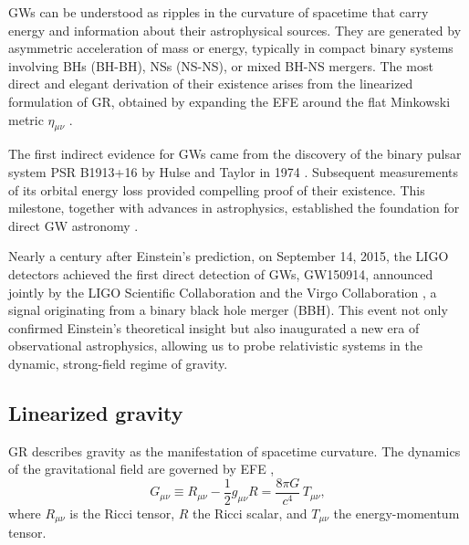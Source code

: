 GWs can be understood as ripples in the curvature of spacetime that carry energy and information about their astrophysical sources. They are generated by asymmetric acceleration of mass or energy, typically in compact binary systems involving BHs (BH-BH), NSs (NS-NS), or mixed BH-NS mergers. The most direct and elegant derivation of their existence arises from the linearized formulation of GR, obtained by expanding the EFE around the flat Minkowski metric $\eta_{\mu\nu}$ \cite{maggiore2007gravitational}.

The first indirect evidence for GWs came from the discovery of the binary pulsar system PSR B1913+16 by Hulse and Taylor in 1974 \cite{Binarypulsar}. Subsequent measurements of its orbital energy loss provided compelling proof of their existence. This milestone, together with advances in astrophysics, established the foundation for direct GW astronomy \cite{GW150914}.

Nearly a century after Einstein’s prediction, on September 14, 2015, the LIGO detectors achieved the first direct detection of GWs, GW150914, announced jointly by the LIGO Scientific Collaboration and the Virgo Collaboration \cite{GW150914}, a signal originating from a binary black hole merger (BBH). This event not only confirmed Einstein’s theoretical insight but also inaugurated a new era of observational astrophysics, allowing us to probe relativistic systems in the dynamic, strong-field regime of gravity.


 

\subsection{Linearized gravity}

GR describes gravity as the manifestation of spacetime curvature.
The dynamics of the gravitational field are governed by EFE \cite{maggiore2007gravitational},
\begin{equation}
G_{\mu\nu} \equiv R_{\mu\nu} - \frac{1}{2} g_{\mu\nu} R = \frac{8\pi G}{c^4} \, T_{\mu\nu},
\label{eq:einsteinfieldeqs}
\end{equation}
where $R_{\mu\nu}$ is the Ricci tensor, $R$ the Ricci scalar, and $T_{\mu\nu}$ the
energy-momentum tensor.

